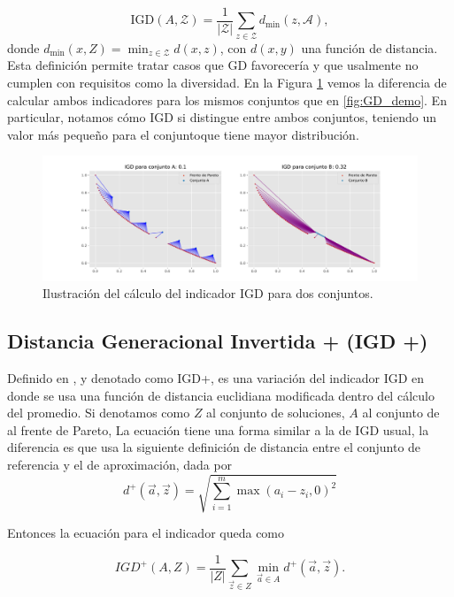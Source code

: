 \begin{equation} \label{eq:IGD}
    \text{IGD}(A,\mathcal{Z})=\frac{1}{|\mathcal{Z}|}\sum_{z\in\mathcal{Z}} d_{\min}(z,\mathcal{A}), \nonumber
\end{equation}
donde $d_{\min}(x,Z)=\min_{z \in \mathcal{Z}}{d(x,z)}$, con $d(x,y)$ una función de distancia. Esta definición permite tratar casos que GD favorecería y que usalmente no cumplen con requisitos como la diversidad. En la Figura \ref{fig:IGD_demo} vemos la diferencia de calcular ambos indicadores para los mismos conjuntos que en \ref{fig:GD_demo}. En particular, notamos cómo IGD si distingue entre ambos conjuntos, teniendo un valor más pequeño para el conjuntoque tiene mayor distribución.

\begin{figure}[H]
    \centering
    \includegraphics[width=\textwidth]{Figuras/IGD_demo.pdf}
    \caption[IGD]{Ilustración del cálculo del indicador IGD para dos conjuntos.}
    \label{fig:IGD_demo}
\end{figure}


\subsection{Distancia Generacional Invertida + (IGD +)} \label{sec:IGDp}
Definido en \cite{ishibuchiModifiedDistanceCalculation2015}, y denotado como IGD+, es una variación del indicador IGD en donde se usa una función de distancia euclidiana modificada dentro del cálculo del promedio. Si denotamos como $Z$ al conjunto de soluciones, $A$ al conjunto de al frente de Pareto, La ecuación tiene una forma similar a la de IGD usual, la diferencia es que usa la siguiente definición de distancia entre el conjunto de referencia y el de aproximación, dada por $$d^{+}(\vec{a},\vec{z})=\sqrt{\sum_{i=1}^m \max(a_i-z_i,0)^2} $$

Entonces la ecuación para el indicador queda como

\begin{equation} \label{eq:IGDp}
    IGD^+(A,Z) =  \frac{1}{|Z|} \sum_{\vec{z}\in Z}\min_{\vec{a}\in A} d^{+}(\vec{a},\vec{z}).
\end{equation}


